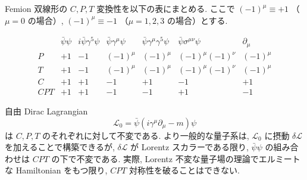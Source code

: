 \documentclass[a4paper,12pt]{article}
\begin{document}
Femion 双線形の $C,P,T$ 変換性を以下の表にまとめる.  
ここで $(-1)^\mu\equiv+1$ （$\mu=0$ の場合）, $(-1)^\mu\equiv-1$ （$\mu=1,2,3$ の場合）とする.

\begin{equation*}
\begin{array}{c|cccccc}
& \bar{\psi}\psi & i\bar{\psi}\gamma^5\psi & \bar{\psi}\gamma^\mu\psi & 
\bar{\psi}\gamma^\mu\gamma^5\psi & \bar{\psi}\sigma^{\mu\nu}\psi & \partial_\mu \\ \hline
P & +1 & -1 & (-1)^\mu & (-1)^\mu & (-1)^\mu(-1)^\nu & (-1)^\mu \\
T & +1 & -1 & (-1)^\mu & (-1)^\mu & (-1)^\mu(-1)^\nu & (-1)^\mu \\
C & +1 & +1 & -1 & +1 & -1 & +1 \\
CPT & +1 & +1 & -1 & -1 & +1 & -1
\end{array}
\end{equation*}


自由 Dirac Lagrangian
\begin{equation*}
\mathcal{L}_0 = \bar{\psi}(i\gamma^\mu\partial_\mu - m)\psi
\end{equation*}
は $C,P,T$ のそれぞれに対して不変である.  
より一般的な量子系は, $\mathcal{L}_0$ に摂動 $\delta\mathcal{L}$ を加えることで構築できるが,  
$\delta\mathcal{L}$ が Lorentz スカラーである限り, $\bar{\psi}\psi$ の組み合わせは $CPT$ の下で不変である. 実際, Lorentz 不変な量子場の理論でエルミートな Hamiltonian をもつ限り, $CPT$ 対称性を破ることはできない.
\end{document}

